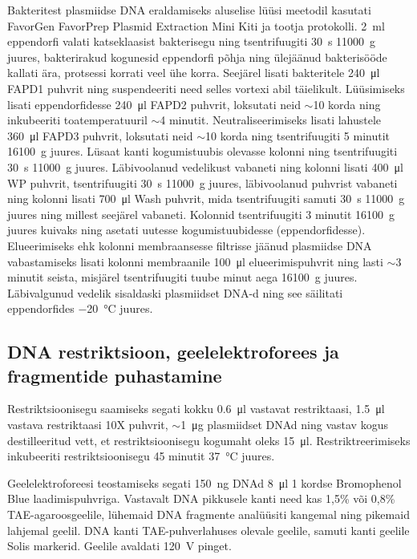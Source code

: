 \documentclass{trkut}%
\begin{document}
Bakteritest plasmiidse DNA eraldamiseks aluselise lüüsi meetodil kasutati FavorGen FavorPrep Plasmid Extraction Mini Kiti ja tootja protokolli. \SI{2}{\milli\litre} eppendorfi valati katseklaasist bakterisegu ning tsentrifuugiti \SI{30}{\second} \SI{11000}{\g} juures, bakterirakud kogunesid eppendorfi põhja ning ülejäänud bakterisööde kallati ära, protsessi korrati veel ühe korra. Seejärel lisati bakteritele \SI{240}{\micro\litre} FAPD1 puhvrit ning suspendeeriti need selles vortexi abil täielikult. Lüüsimiseks lisati eppendorfidesse \SI{240}{\micro\litre} FAPD2 puhvrit, loksutati neid $\sim$10 korda ning inkubeeriti toatemperatuuril $\sim$4 minutit. Neutraliseerimiseks lisati lahustele \SI{360}{\micro\litre} FAPD3 puhvrit, loksutati neid $\sim$10 korda ning tsentrifuugiti 5 minutit \SI{16100}{\g} juures. Lüsaat kanti kogumistuubis olevasse kolonni ning tsentrifuugiti \SI{30}{\second} \SI{11000}{\g} juures. Läbivoolanud vedelikust vabaneti ning kolonni lisati \SI{400}{\micro\litre} WP puhvrit, tsentrifuugiti \SI{30}{\second} \SI{11000}{\g} juures, läbivoolanud puhvrist vabaneti ning kolonni lisati \SI{700}{\micro\litre} Wash puhvrit, mida tsentrifuugiti samuti \SI{30}{\second} \SI{11000}{\g} juures ning millest seejärel vabaneti. Kolonnid tsentrifuugiti 3 minutit \SI{16100}{\g} juures kuivaks ning asetati uutesse kogumistuubidesse (eppendorfidesse). Elueerimiseks ehk kolonni membraansesse filtrisse jäänud plasmiidse DNA vabastamiseks lisati kolonni membraanile \SI{100}{\micro\litre} elueerimispuhvrit ning lasti $\sim$3 minutit seista, misjärel tsentrifuugiti tuube minut aega \SI{16100}{\g} juures. Läbivalgunud vedelik sisaldaski plasmiidset DNA-d ning see säilitati eppendorfides \SI{-20}{\celsius} juures.

\subsection{DNA restriktsioon, geelelektroforees ja fragmentide puhastamine}

Restriktsioonisegu saamiseks segati kokku \SI{0,6}{\micro\litre} vastavat restriktaasi, \SI{1,5}{\micro\litre} vastava restriktaasi 10X puhvrit, $\sim$\SI{1}{\micro\gram} plasmiidset DNAd ning vastav kogus destilleeritud vett, et restriktsioonisegu kogumaht oleks \SI{15}{\micro\litre}. Restriktreerimiseks inkubeeriti restriktsioonisegu 45 minutit \SI{37}{\celsius} juures.

Geelelektroforeesi teostamiseks segati \SI{150}{\nano\gram} DNAd \SI{8}{\micro\litre} 1 kordse Bromophenol Blue laadimispuhvriga. Vastavalt DNA pikkusele kanti need kas 1,5\% või 0,8\% TAE-agaroosgeelile, lühemaid DNA fragmente analüüsiti kangemal ning pikemaid lahjemal geelil. DNA kanti TAE-puhverlahuses olevale geelile, samuti kanti geelile Solis markerid. Geelile avaldati \SI{120}{\volt} pinget.
\end{document}
